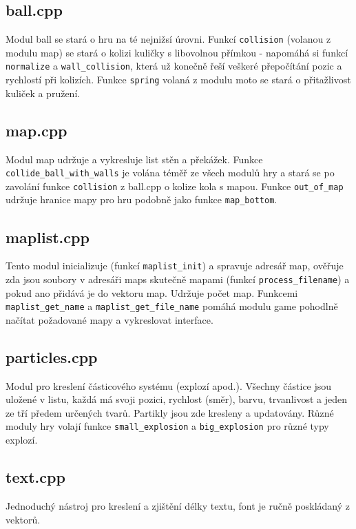 \documentclass{article}
\begin{document}
\subsection{ball.cpp}
Modul ball se stará o hru na té nejnižsí úrovni. Funkcí \texttt{collision} (volanou z modulu map) se stará o kolizi kuličky s libovolnou přímkou - napomáhá si funkcí \texttt{normalize} a \texttt{wall\_collision}, která už konečně řeší veškeré přepočítání pozic a rychlostí při kolizích. Funkce \texttt{spring} volaná z modulu moto se stará o přitažlivost kuliček a pružení.

\subsection{map.cpp}
Modul map udržuje a vykresluje list stěn a překážek. Funkce \texttt{collide\_ball\_with\_walls} je volána téměř ze všech modulů hry a stará se po zavolání funkce \texttt{collision} z ball.cpp o kolize kola s mapou. Funkce \texttt{out\_of\_map} udržuje hranice mapy pro hru podobně jako funkce \texttt{map\_bottom}.

\subsection{maplist.cpp}
Tento modul inicializuje (funkcí \texttt{maplist\_init}) a spravuje adresář map, ověřuje zda jsou soubory v adresáři maps skutečně mapami (funkcí \texttt{process\_filename}) a pokud ano přidává je do vektoru map. Udržuje počet map. Funkcemi \texttt{maplist\_get\_name} a \texttt{maplist\_get\_file\_name} pomáhá modulu game pohodlně načítat požadované mapy a vykreslovat interface.

\subsection{particles.cpp}
Modul pro kreslení částicového systému (explozí apod.). Všechny
částice jsou uložené v listu, každá má
svoji pozici, rychlost (směr), barvu, trvanlivost a jeden ze tří
předem určených tvarů. Partikly jsou zde kresleny a updatovány. Různé moduly hry volají funkce \texttt{small\_explosion} a \texttt{big\_explosion} pro různé typy explozí.

\subsection{text.cpp}
Jednoduchý nástroj pro kreslení a zjištění délky textu, font je ručně poskládaný z vektorů.
\end{document}
